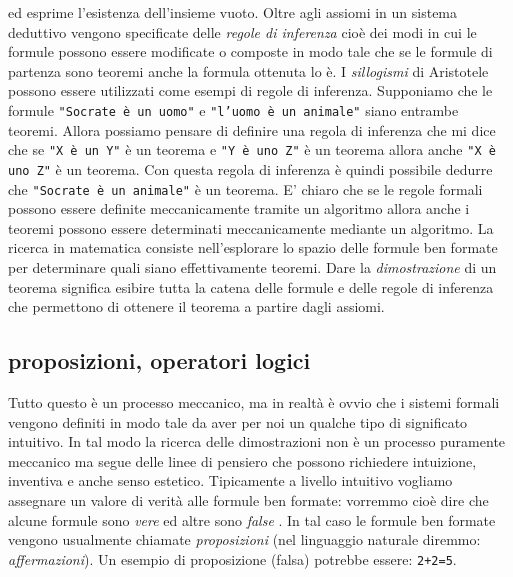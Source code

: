 ed esprime l'esistenza dell'insieme vuoto.
Oltre agli assiomi in un sistema deduttivo vengono specificate delle 
\emph{regole di inferenza} cioè dei modi in cui 
le formule possono essere modificate o composte in modo tale che se le formule 
di partenza sono teoremi anche la formula ottenuta lo è.
I \emph{sillogismi} di Aristotele possono essere utilizzati come esempi di regole 
di inferenza. 
Supponiamo che le formule 
\texttt{"Socrate è un uomo"} 
e \texttt{"l'uomo è un animale"}
siano entrambe teoremi. Allora possiamo pensare di definire una regola di inferenza 
che mi dice che se \texttt{"X è un Y"} è un teorema 
e \texttt{"Y è uno Z"}
è un teorema allora anche \texttt{"X è uno Z"} è un teorema. 
Con questa regola di inferenza è quindi possibile dedurre che 
\texttt{"Socrate è un animale"}
è un teorema.
E' chiaro che se le regole formali possono essere definite meccanicamente 
tramite un algoritmo allora anche i teoremi possono essere determinati meccanicamente 
mediante un algoritmo.
La ricerca in matematica consiste nell'esplorare lo spazio delle formule ben formate 
per determinare quali siano effettivamente teoremi. 
Dare la \emph{dimostrazione}%
%
 di un teorema significa esibire tutta la catena delle formule 
e delle regole di inferenza che permettono di ottenere il teorema a partire dagli 
assiomi.

\subsection{proposizioni, operatori logici}

Tutto questo è un processo meccanico, ma in realtà è ovvio che i sistemi formali 
vengono definiti in modo tale da aver per noi un qualche tipo di significato intuitivo.
In tal modo la ricerca delle dimostrazioni non è un processo puramente meccanico 
ma segue delle linee di pensiero che possono richiedere intuizione, inventiva e anche 
senso estetico. 
Tipicamente a livello intuitivo vogliamo assegnare un valore di verità alle formule 
ben formate: vorremmo cioè dire che alcune formule sono 
\emph{vere}%
%
ed altre sono 
\emph{false}%
%
. 
In tal caso le formule ben formate vengono usualmente chiamate \emph{proposizioni}%
%
(nel linguaggio naturale diremmo: \emph{affermazioni}).
Un esempio di proposizione (falsa) potrebbe essere: 
\texttt{2+2=5}.

